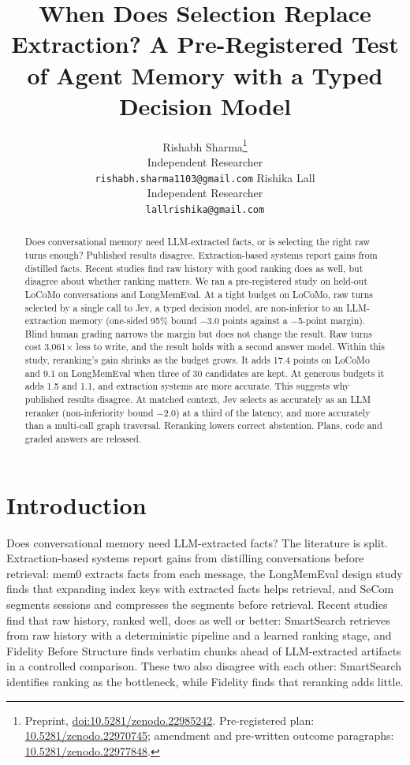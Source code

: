 \documentclass[11pt]{article}
\title{When Does Selection Replace Extraction? A Pre-Registered Test of Agent Memory with a Typed Decision Model}
\author{Rishabh Sharma\thanks{Preprint,
  \href{https://doi.org/10.5281/zenodo.22985242}{doi:10.5281/zenodo.22985242}. Pre-registered plan:
  \href{https://doi.org/10.5281/zenodo.22970745}{10.5281/zenodo.22970745}; amendment and pre-written outcome
  paragraphs: \href{https://doi.org/10.5281/zenodo.22977848}{10.5281/zenodo.22977848}.} \\
  Independent Researcher \\
  \texttt{rishabh.sharma1103@gmail.com} \And
  Rishika Lall \\
  Independent Researcher \\
  \texttt{lallrishika@gmail.com}}
\newcommand{\src}[1]{}
\begin{document}
\maketitle
\begin{abstract}
Does conversational memory need LLM-extracted facts, or is selecting the right raw turns enough? Published results disagree. Extraction-based systems report gains from distilled facts. Recent studies find raw history with good ranking does as well, but disagree about whether ranking matters. We ran a pre-registered study on held-out LoCoMo conversations and LongMemEval. At a tight budget on LoCoMo, raw turns selected by a single call to Jev, a typed decision model, are non-inferior to an LLM-extraction memory (one-sided 95\% bound $-$3.0\src{bench/results/v3/batch\_b\_report.json\#H1/lower\_bound\_95\_one\_sided} points against a $-$5\src{docs/V3\_PLAN.md §1, §2, §4}-point margin). Blind human grading narrows the margin but does not change the result. Raw turns cost 3,061\src{bench/results/v3/batch\_b\_report.json\#write\_cost\_ratio\_engram\_over\_t0r/ratio}$\times$ less to write, and the result holds with a second answer model. Within this study, reranking's gain shrinks as the budget grows. It adds 17.4\src{bench/results/v3/batch\_a\_report.json\#fresh (T0R k3 - L0 k3)} points on LoCoMo and 9.1\src{bench/results/v3/batch\_c\_report.json\#expansion (T0R 3 - L0 3)} on LongMemEval when three of 30\src{docs/V3\_PLAN.md §1, §2, §4} candidates are kept. At generous budgets it adds 1.5\src{bench/results/v3/batch\_a\_report.json\#fresh (T0R k20 - L0 k20)} and 1.1\src{bench/results/v3/batch\_c\_report.json\#expansion (T0R 20 - L0 20)}, and extraction systems are more accurate. This suggests why published results disagree. At matched context, Jev selects as accurately as an LLM reranker (non-inferiority bound $-$2.0\src{bench/results/v3/batch\_b\_report.json\#S4/lower\_bound\_95\_one\_sided}) at a third of the latency, and more accurately than a multi-call graph traversal. Reranking lowers correct abstention. Plans, code and graded answers are released.

\end{abstract}
\section{Introduction}\label{sec:1}
Does conversational memory need LLM-extracted facts? The literature is split. Extraction-based systems report gains from distilling conversations before retrieval: mem0 \citep{chhikara2025mem0} extracts facts from each message, the LongMemEval design study \citep{wu2025longmemeval} finds that expanding index keys with extracted facts helps retrieval, and SeCom \citep{pan2025secom} segments sessions and compresses the segments before retrieval. Recent studies find that raw history, ranked well, does as well or better: SmartSearch \citep{derehag2026smartsearch} retrieves from raw history with a deterministic pipeline and a learned ranking stage, and Fidelity Before Structure \citep{an2026fidelity} finds verbatim chunks ahead of LLM-extracted artifacts in a controlled comparison. These two also disagree with each other: SmartSearch identifies ranking as the bottleneck, while Fidelity finds that reranking adds little.
\end{document}
